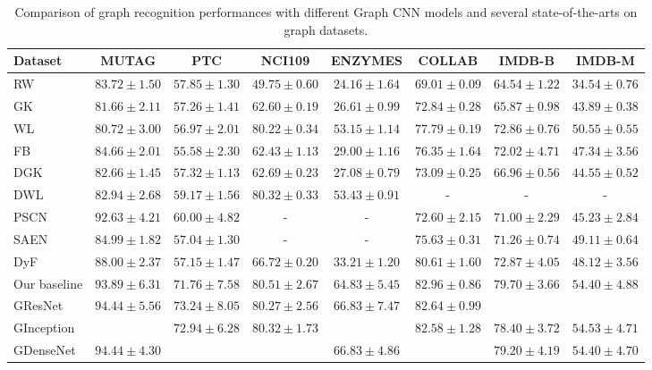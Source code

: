 \documentclass[journal]{IEEEtran}
\begin{document}
\begin{table*}[!t]
\centering
	\renewcommand\arraystretch{1.3}
	\caption{Comparison of graph recognition performances with different Graph CNN models and several state-of-the-arts on graph datasets.}
	\footnotesize
	\begin{tabular}[width=0.8\linewidth]{l|ccccccc} \hline  Dataset & MUTAG &PTC  &NCI109 &ENZYMES &COLLAB &IMDB-B &IMDB-M\\
		\hline	\hline
		RW \cite{rw2003}   &$83.72\pm1.50$ &$57.85\pm1.30$  &$49.75\pm0.60$  &$24.16\pm1.64$  &$69.01\pm0.09$   &$64.54\pm1.22$   &$34.54\pm0.76$\\
		GK \cite{gk2009}  &$81.66\pm2.11$ &$57.26\pm1.41$  &$62.60\pm0.19$  &$26.61\pm0.99$   &$72.84\pm0.28$   &$65.87\pm0.98$   &$43.89\pm0.38$\\
		WL \cite{wl2011}  &$80.72\pm3.00$ &$56.97\pm2.01$  &$80.22\pm0.34$  &$53.15\pm1.14$   &$77.79\pm0.19$   &$72.86\pm0.76$   &$50.55\pm0.55$\\
		FB \cite{BrunaZSL13}  &$84.66\pm2.01$ &$55.58\pm2.30$  &$62.43\pm1.13$  &$29.00\pm1.16$   &$76.35\pm1.64$   &$72.02\pm4.71$   &$47.34\pm3.56$\\
		DGK \cite{DGKandDWL2015}  &$82.66\pm1.45$ &$57.32\pm1.13$  &$62.69\pm0.23$  &$27.08\pm0.79$   &$73.09\pm0.25$   &$66.96\pm0.56$   &$44.55\pm0.52$\\
		DWL \cite{DGKandDWL2015}  &$82.94\pm2.68$ &$59.17\pm1.56$  &$80.32\pm0.33$  &$53.43\pm0.91$   &-  &-  &-\\
		PSCN \cite{niepert2016learning} &$92.63\pm4.21$ &$60.00\pm4.82$   &-              &-                &$72.60\pm2.15$   &$71.00\pm2.29$  &$45.23\pm2.84$\\
		SAEN \cite{saen2017} &$84.99\pm1.82$ &$57.04\pm1.30$   &-              &-                &$75.63\pm0.31$   &$71.26\pm0.74$  &$49.11\pm0.64$\\
		DyF \cite{DyGraph2017}  &$88.00\pm2.37$ &$57.15\pm1.47$  &$66.72\pm0.20$ &$33.21\pm1.20$  &$80.61\pm1.60$   &$72.87\pm4.05$  &$48.12\pm3.56$\\
		\hline \hline
		Our baseline   &$93.89\pm6.31$  &$71.76\pm7.58$  &$80.51\pm2.67$  &$64.83\pm5.45$  &$82.96\pm0.86$  &$79.70\pm3.66$  &$54.40\pm4.88$\\		
		G\underline{\hspace{0.5em}}ResNet  &$94.44\pm5.56$ &$73.24\pm8.05$ &$80.27\pm2.56$ &$66.83\pm7.47$  &$82.64\pm0.99$  &\bm{$79.90\pm3.96$} &\bm{$54.53\pm4.25$}\\
		G\underline{\hspace{0.5em}}Inception  & \bm{$95.00\pm4.61$}  &$72.94\pm6.28$   &$80.32\pm1.73$  &\bm{$67.50\pm5.54$}  &$82.58\pm1.28$  &$78.40\pm3.72$  &$54.53\pm4.71$\\
		G\underline{\hspace{0.5em}}DenseNet   &$94.44\pm4.30$  &\bm{$73.24\pm6.64$}    &\bm{$80.66\pm2.49$}  &$66.83\pm4.86$  &\bm{$83.16\pm1.00$}  &$79.20\pm4.19$  &$54.40\pm4.70$ \\
		\hline
	\end{tabular} \vspace{0.15cm}
	\label{compres} \vspace{-0.1cm}
\end{table*}
\end{document}
